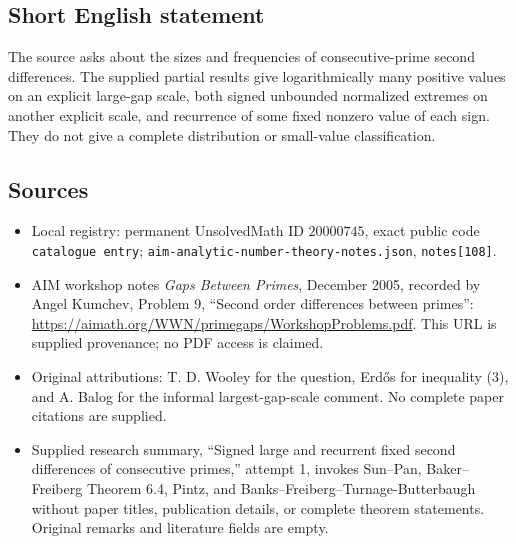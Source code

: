 \documentclass[11pt]{article}
\begin{document}
\subsection{Short English statement}
The source asks about the sizes and frequencies of consecutive-prime second differences. The supplied partial results give logarithmically many positive values on an explicit large-gap scale, both signed unbounded normalized extremes on another explicit scale, and recurrence of some fixed nonzero value of each sign. They do not give a complete distribution or small-value classification.
\subsection{Sources}
\begin{itemize}
\item Local registry: permanent UnsolvedMath ID \(20000745\), exact public code \texttt{catalogue entry}; \texttt{aim-analytic-number-theory-notes.json}, \texttt{notes[108]}.
\item AIM workshop notes \emph{Gaps Between Primes}, December 2005, recorded by Angel Kumchev, Problem 9, ``Second order differences between primes'': \url{https://aimath.org/WWN/primegaps/WorkshopProblems.pdf}. This URL is supplied provenance; no PDF access is claimed.
\item Original attributions: T. D. Wooley for the question, Erd\H{o}s for inequality (3), and A. Balog for the informal largest-gap-scale comment. No complete paper citations are supplied.
\item Supplied research summary, ``Signed large and recurrent fixed second differences of consecutive primes,'' attempt 1, invokes Sun--Pan, Baker--Freiberg Theorem 6.4, Pintz, and Banks--Freiberg--Turnage-Butterbaugh without paper titles, publication details, or complete theorem statements. Original remarks and literature fields are empty.
\end{itemize}
\end{document}
